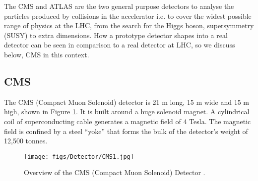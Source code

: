 The CMS and ATLAS are the two general purpose detectors to analyse the particles produced by collisions in the accelerator i.e. to cover the widest possible range of physics at the LHC,
from the search for the Higgs boson, supersymmetry (SUSY) to extra dimensions. How a prototype detector shapes into a real detector can be seen in comparison to a real detector at LHC, so we discuss below, CMS in this context.
\subsection{CMS}
The CMS (Compact Muon Solenoid) detector  is 21 m long, 15 m wide and 15 m high, shown in Figure \ref{CMS}. It is built around a huge solenoid magnet. A cylindrical coil of superconducting cable generates a magnetic field of 4 Tesla. The magnetic field is confined by a steel ``yoke'' that forms the bulk of the detector's weight of 12,500 tonnes. 

\begin{figure}[h!]
\begin{center} 
\texttt{[image: figs/Detector/CMS1.jpg]}
\caption{Overview of the CMS (Compact Muon Solenoid) Detector .}
\label{CMS}
\end{center}
\end{figure}

